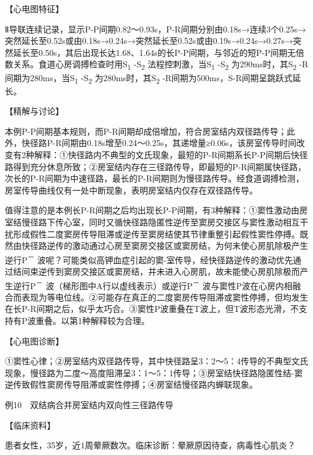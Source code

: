 【心电图特征】

Ⅱ导联连续记录，显示P-P间期0.82～0.93s，P-R间期分别由0.18s→连续3个0.25s→突然延长至0.52s或由0.18s→0.24s→突然延长至0.52s或由0.19s→0.24s→0.27s→突然延长至0.50s，其后出现长达1.68、1.64s的长P-P间期，与邻近的短P-P间期无倍数关系。食道心房调搏检查时用S\textsubscript{1}
-S\textsubscript{2} 法程控刺激，当S\textsubscript{1} -S\textsubscript{2}
为290ms时，其S\textsubscript{2} -R间期为280ms，当S\textsubscript{1}
-S\textsubscript{2} 为280ms时，其S\textsubscript{2}
-R间期为500ms，S-R间期呈跳跃式延长。

【精解与讨论】

本例P-P间期基本规则，而P-R间期却成倍增加，符合房室结内双径路传导；此外，快径路P-R间期由0.18s增至0.24～0.25s，其递增量≥0.06s，该房室传导时间改变有2种解释：①快径路内不典型的文氏现象，最短的P-R间期系长P-P间期后快径路得到充分休息所致；②房室结内存在三径路传导，即最短的P-R间期属快径路，次长的P-R间期为中速径路，最长的P-R间期则为慢径路传导。经食道调搏检测，房室传导曲线仅有一处中断现象，表明房室结内仅存在双径路传导。

值得注意的是本例长P-R间期之后均出现长P-P间期，有3种解释：①窦性激动由房室结慢径路下传心室，同时又循快径路隐匿性逆传至窦房交接区与窦性激动相互干扰形成假性二度窦房传导阻滞或逆传至窦房结使其节律重整引起假性窦性停搏。既然由快径路逆传的激动通过心房至窦房交接区或窦房结，为何未使心房肌除极产生逆行P\textsuperscript{－}
波呢？可能类似高钾血症引起的窦-室传导，经快径路逆传的激动优先通过结间束逆传到窦房交接区或窦房结，并未进入心房肌，故未能使心房肌除极而产生逆行P\textsuperscript{－}
波（梯形图中A行以虚线表示）或逆行P\textsuperscript{－}
波与窦性P波在心房内相融合而表现为等电位线。②可能存在真正的二度窦房传导阻滞或窦性停搏，但均发生在长P-R间期之后，似乎太巧合。③窦性P波重叠在T波上，但T波形态光滑，不支持有P波重叠。以第1种解释较为合理。

【心电图诊断】

①窦性心律；②房室结内双径路传导，其中快径路呈3：2～5：4传导的不典型文氏现象，慢径路为二度～高度阻滞呈3：1～5：1传导；③房室结快径路隐匿性结-窦逆传致假性窦房传导阻滞或窦性停搏；④房室结慢径路内蝉联现象。

例10　双结病合并房室结内双向性三径路传导

【临床资料】

患者女性，35岁，近1周晕厥数次。临床诊断：晕厥原因待查，病毒性心肌炎？

